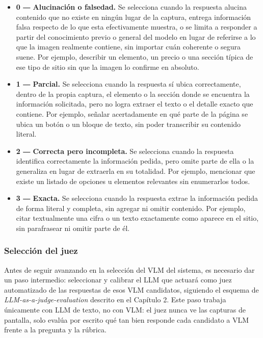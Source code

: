 \begin{itemize}
    \item \textbf{0 ― Alucinación o falsedad.} Se selecciona cuando la respuesta alucina contenido que no existe en ningún lugar de la captura, entrega información falsa respecto de lo que esta efectivamente muestra, o se limita a responder a partir del conocimiento previo o general del modelo en lugar de referirse a lo que la imagen realmente contiene, sin importar cuán coherente o segura suene. Por ejemplo, describir un elemento, un precio o una sección típica de ese tipo de sitio sin que la imagen lo confirme en absoluto.
    \item \textbf{1 ― Parcial.} Se selecciona cuando la respuesta sí ubica correctamente, dentro de la propia captura, el elemento o la sección donde se encuentra la información solicitada, pero no logra extraer el texto o el detalle exacto que contiene. Por ejemplo, señalar acertadamente en qué parte de la página se ubica un botón o un bloque de texto, sin poder transcribir su contenido literal.
    \item \textbf{2 ― Correcta pero incompleta.} Se selecciona cuando la respuesta identifica correctamente la información pedida, pero omite parte de ella o la generaliza en lugar de extraerla en su totalidad. Por ejemplo, mencionar que existe un listado de opciones u elementos relevantes sin enumerarlos todos.
    \item \textbf{3 ― Exacta.} Se selecciona cuando la respuesta extrae la información pedida de forma literal y completa, sin agregar ni omitir contenido. Por ejemplo, citar textualmente una cifra o un texto exactamente como aparece en el sitio, sin parafrasear ni omitir parte de él.
\end{itemize}

\subsubsection{Selección del juez}

Antes de seguir avanzando en la selección del VLM del sistema, es necesario dar un paso intermedio: seleccionar y calibrar el LLM que actuará como juez automatizado de las respuestas de esos VLM candidatos, siguiendo el esquema de \textit{LLM-as-a-judge-evaluation} descrito en el Capítulo 2. Este paso trabaja únicamente con LLM de texto, no con VLM: el juez nunca ve las capturas de pantalla, solo evalúa por escrito qué tan bien responde cada candidato a VLM frente a la pregunta y la rúbrica.

